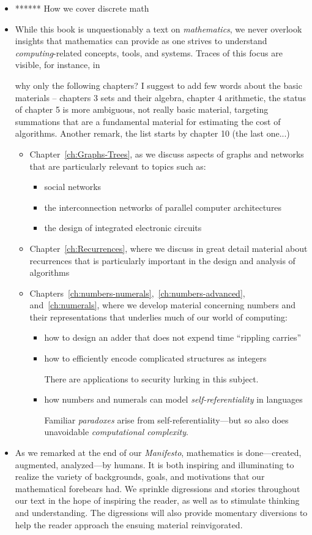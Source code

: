 \begin{itemize}
\item
****** How we cover discrete math

\item
While this book is unquestionably a text on {\em mathematics}, we
never overlook insights that mathematics can provide as one strives to
understand {\em computing}-related concepts, tools, and systems.
Traces of this focus are visible, for instance, in

{\Denis why only the following chapters? I suggest to add few words about the basic materials -- chapters 3 sets and their algebra, 
chapter 4 arithmetic, the status of chapter 5 is more ambiguous, not really basic material, targeting summations that are 
a fundamental material for estimating the cost of algorithms.
Another remark, the list starts by chapter 10 (the last one...)}
  \begin{itemize}
  \item
Chapter~\ref{ch:Graphs-Trees}, as we discuss aspects of graphs and
networks that are particularly relevant to topics such as:
     \begin{itemize}
     \item
social networks
     \item
the interconnection networks of parallel computer architectures
     \item
the design of integrated electronic circuits
     \end{itemize}
  \item
Chapter~\ref{ch:Recurrences}, where we discuss in great detail
material about recurrences that is particularly important in the
design and analysis of algorithms
  \item
Chapters~\ref{ch:numbers-numerals},~\ref{ch:numbers-advanced},
and~\ref{ch:numerals}, where we develop material concerning numbers
and their representations that underlies much of our world of
computing:
     \begin{itemize}
     \item
how to design an adder that does not expend time ``rippling carries''
     \item
how to efficiently encode complicated structures as integers

There are applications to security lurking in this subject.
     \item
how numbers and numerals can model {\em self-referentiality} in
languages

Familiar {\it paradoxes} arise from self-referentiality---but so also
does unavoidable {\em computational complexity}.
     \end{itemize}
  \end{itemize}
\item
As we remarked at the end of our {\it Manifesto}, mathematics is
done---created, augmented, analyzed---by humans.  It is both inspiring
and illuminating to realize the variety of backgrounds, goals, and
motivations that our mathematical forebears had.  We sprinkle
digressions and stories throughout our text in the hope of inspiring
the reader, as well as to stimulate thinking and understanding.  The
digressions will also provide momentary diversions to help the reader
approach the ensuing material reinvigorated.


\end{itemize}

